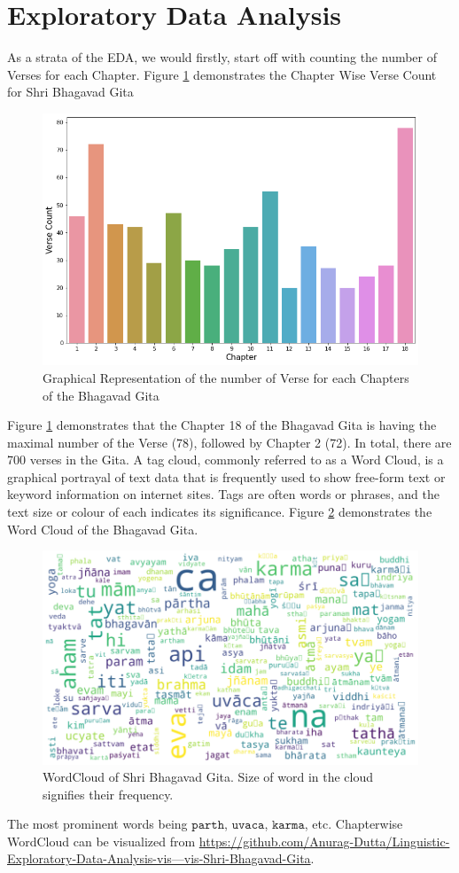 \documentclass[runningheads]{llncs}
\begin{document}
\section{Exploratory Data Analysis}
As a strata of the EDA, we would firstly, start off with counting the number of Verses for each Chapter. Figure \ref{fig1} demonstrates the Chapter Wise Verse Count for Shri Bhagavad Gita
\begin{figure}
\centering
\includegraphics[width=\textwidth]{1}
\caption{Graphical Representation of the number of Verse for each Chapters of the Bhagavad Gita}
\label{fig1}
\end{figure} 
Figure \ref{fig1} demonstrates that the Chapter 18 of the Bhagavad Gita is having the maximal number of the Verse (78), followed by Chapter 2 (72). In total, there are 700 verses in the Gita. A tag cloud, commonly referred to as a Word Cloud, is a graphical portrayal of text data that is frequently used to show free-form text or keyword information on internet sites. Tags are often words or phrases, and the text size or colour of each indicates its significance. Figure \ref{fig2} demonstrates the Word Cloud of the Bhagavad Gita.
\begin{figure}
\centering
\includegraphics[width=\textwidth]{2}
\caption{WordCloud of Shri Bhagavad Gita. Size of word in the cloud signifies their frequency. }
\label{fig2}
\end{figure} 
The most prominent words being $\mathtt{parth}$, $\mathtt{uvaca}$, $\mathtt{karma}$, etc. 
Chapterwise WordCloud can be visualized from \href{https://github.com/Anurag-Dutta/Linguistic-Exploratory-Data-Analysis-vis---vis-Shri-Bhagavad-Gita}{https://github.com/Anurag-Dutta/Linguistic-Exploratory-Data-Analysis-vis---vis-Shri-Bhagavad-Gita}. 
\end{document}
